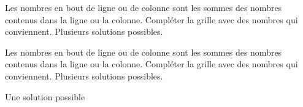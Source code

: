 \begin{exercice*}[Yohaku]
  Les nombres en bout de ligne ou de colonne sont les sommes des nombres contenus dans la ligne ou la colonne.
  Compléter la grille avec des nombres qui conviennent. Plusieurs solutions possibles.
  \begin{center}
  \end{center}

 \end{exercice*}
\begin{corrige}  
    Les nombres en bout de ligne ou de colonne sont les sommes des nombres contenus dans la ligne ou la colonne.
    Compléter la grille avec des nombres qui conviennent. Plusieurs solutions possibles.

    {\red Une solution possible}

    \medskip
    \begin{center}
    \end{center} 
\end{corrige}
